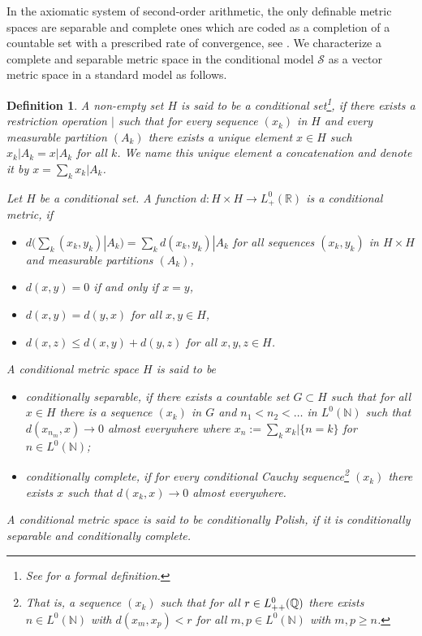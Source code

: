 \documentclass{jloganal}
\numberwithin{equation}{section}
\theoremstyle{plain}
\newtheorem{definition}[subsection]{Definition}
\renewcommand{\leq}{\leqslant}
\renewcommand{\geq}{\geqslant}
\begin{document}
In the axiomatic system of second-order arithmetic, the only definable metric spaces are separable and complete ones which are coded as a completion of a countable set with a prescribed rate of convergence, see \cite[Definition II.5.1]{simpson2009subsystems}. 
We characterize a complete and separable metric space in the conditional model $\mathcal{S}$ as a vector metric space in a standard model as follows.
\begin{definition}\label{d:polishspace}
A non-empty set $H$ is said to be a \emph{conditional set}\footnote{See \cite[Definition 2.1]{drapeau2016algebra} for a formal definition.}, if there exists a restriction operation $|$ such that for every sequence $(x_k)$ in $H$ and every measurable partition $(A_k)$ there exists a unique element $x\in H$ such $x_k|A_k=x|A_k$ for all $k$. 
We name  this unique element a concatenation and denote it by $x=\sum_k x_k|A_k$. 

 Let $H$ be a conditional set. 
A function $d\colon H\times H\to L^0_{+}(\mathbb{R})$ is a \emph{conditional metric}, if   
\begin{itemize}
\item $d(\sum_k (x_k,y_k)|A_k)=\sum_{k} d(x_k,y_k)|A_k$ for all sequences $(x_k,y_k)$ in $H\times H$ and measurable partitions $(A_k)$,    
\item $d(x,y)=0$ if and only if $x=y$, 
\item $d(x,y)=d(y,x)$ for all $x,y\in H$, 
\item $d(x,z)\leq d(x,y)+d(y,z)$ for all $x,y,z \in H$. 
\end{itemize} 
A conditional metric space $H$ is said to be 
\begin{itemize}
\item \emph{conditionally separable}, if there exists a countable set $G\subset H$ such that for all $x\in H$ there is a sequence $(x_k)$ in $G$ and $n_1<n_2<\ldots$ in $L^0(\mathbb{N})$ such that $d(x_{n_m},x)\to 0$ almost everywhere where $x_{n}:=\sum_k x_k|\{n=k\}$ for $n\in L^0(\mathbb{N})$; 
\item \emph{conditionally complete}, if for every \emph{conditional Cauchy sequence}\footnote{That is, a sequence $(x_k)$ such that for all $r\in L^0_{++}({\mathbb Q})$ there exists $n\in L^0(\mathbb{N})$ with $d(x_m,x_p)<r$ for all $m,p\in L^0(\mathbb{N})$ with $m,p\geq n$.} $(x_k)$ there exists $x$ such that $d(x_k,x)\to 0$ almost everywhere.     
\end{itemize}
A conditional metric space is said to be \emph{conditionally Polish}, if it is conditionally separable and conditionally complete.  
\end{definition} 
\end{document}
